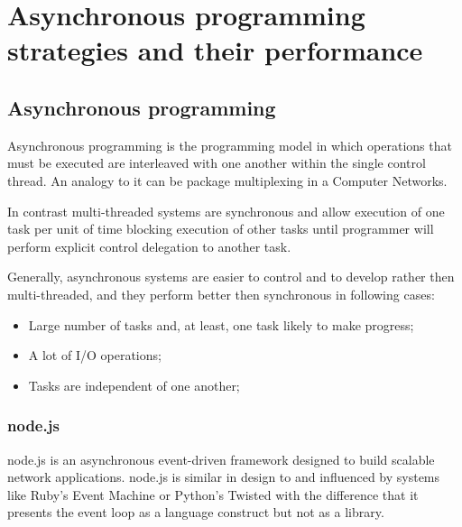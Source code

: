  \chapter{Asynchronous programming strategies and their performance}
 \label{chap:async}
\section{Asynchronous programming}
\label{sec:async}
Asynchronous programming is the programming model in which operations that must be executed are interleaved with one another within the single control thread. An analogy to it can be package multiplexing in a Computer Networks. 

In contrast multi-threaded systems are synchronous and allow execution of one task per unit of time blocking execution of other tasks until programmer will perform explicit control delegation to another task.

Generally, asynchronous systems are easier to control and to develop rather then multi-threaded, and  they perform better then synchronous in following cases\cite{asyncArticle}:
 \begin{itemize}
	\item Large number of tasks and, at least, one task likely to make progress;
	\item A lot of I/O operations;
	\item Tasks are independent of one another;
 \end{itemize}



\subsection{node.js}
\label{subsec:node}
node.js is an asynchronous event-driven framework designed to build scalable network applications.
node.js is similar in design to and influenced by systems like Ruby's Event Machine or Python's Twisted with the difference that it presents the event loop as a language construct but not as a library\cite{nodejsabout}.

